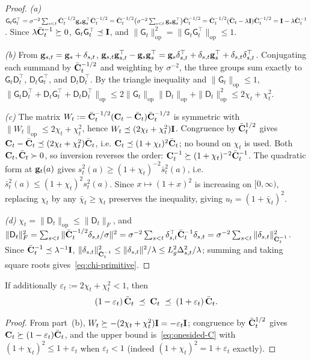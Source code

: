 \documentclass[twoside]{article}
\newcommand{\Gmat}{\mathsf{G}}                  %
\newcommand{\Dmat}{\mathsf{D}}                  %
\begin{document}
\begin{proof}
\emph{(a)}
$\Gmat_t\Gmat_t^\top
=\sigma^{-2}\sum_{s<t}\bCbar_t^{-1/2}\bg_s\bg_s^\top\bCbar_t^{-1/2}
=\bCbar_t^{-1/2}\bigl(\sigma^{-2}\sum_{s<t}\bg_s\bg_s^\top\bigr)\bCbar_t^{-1/2}
=\bCbar_t^{-1/2}(\bCbar_t-\lambda\bI)\bCbar_t^{-1/2}
=\bI-\lambda\bCbar_t^{-1}$.
Since $\lambda\bar{\mathbf{C}}_t^{-1}\succeq0$, $\Gmat_t\Gmat_t^\top\preceq\bI$, and
$\|\Gmat_t\|_{\mathrm{op}}^2=\|\Gmat_t\Gmat_t^\top\|_{\mathrm{op}}\le1$.

\emph{(b)}
From $\mathbf{g}_{s,t}=\mathbf{g}_s+\delta_{s,t}$,
$\mathbf{g}_{s,t}\mathbf{g}_{s,t}^\top-\mathbf{g}_s\mathbf{g}_s^\top
=\mathbf{g}_s\delta_{s,t}^\top+\delta_{s,t}\mathbf{g}_s^\top+\delta_{s,t}\delta_{s,t}^\top$.
Conjugating each summand by $\bar{\mathbf{C}}_t^{-1/2}$ and weighting by
$\sigma^{-2}$, the three groups sum exactly to
$\Gmat_t\Dmat_t^\top$, $\Dmat_t\Gmat_t^\top$, and $\Dmat_t\Dmat_t^\top$.
By the triangle inequality and $\|\Gmat_t\|_{\mathrm{op}}\le1$,
$\|\Gmat_t\Dmat_t^\top+\Dmat_t\Gmat_t^\top+\Dmat_t\Dmat_t^\top\|_{\mathrm{op}}
\le 2\|\Gmat_t\|_{\mathrm{op}}\|\Dmat_t\|_{\mathrm{op}}+\|\Dmat_t\|_{\mathrm{op}}^2
\le 2\chi_t+\chi_t^2$.

\emph{(c)}
The matrix $W_t:=\bar{\mathbf{C}}_t^{-1/2}(\mathbf{C}_t-\bar{\mathbf{C}}_t)\bar{\mathbf{C}}_t^{-1/2}$ is
symmetric with $\|W_t\|_{\mathrm{op}}\le2\chi_t+\chi_t^2$, hence
$W_t\preceq(2\chi_t+\chi_t^2)\mathbf{I}$.  Congruence by $\bar{\mathbf{C}}_t^{1/2}$ gives
$\mathbf{C}_t-\bar{\mathbf{C}}_t\preceq(2\chi_t+\chi_t^2)\bar{\mathbf{C}}_t$, i.e.
$\mathbf{C}_t\preceq(1+\chi_t)^2\bar{\mathbf{C}}_t$; no bound on $\chi_t$ is used.
Both $\mathbf{C}_t,\bar{\mathbf{C}}_t\succ0$, so inversion reverses the order:
$\mathbf{C}_t^{-1}\succeq(1+\chi_t)^{-2}\bar{\mathbf{C}}_t^{-1}$.  The quadratic form at
$\mathbf{g}_t(a)$ gives $s_t^2(a)\ge(1+\chi_t)^{-2}\bar s_t^2(a)$, i.e.
$\bar s_t^2(a)\le(1+\chi_t)^2 s_t^2(a)$.  Since $x\mapsto(1+x)^2$ is
increasing on $[0,\infty)$, replacing $\chi_t$ by any $\bar\chi_t\ge\chi_t$
preserves the inequality, giving $u_t=(1+\bar\chi_t)^2$.

\emph{(d)}
$\chi_t=\|\Dmat_t\|_{\mathrm{op}}\le\|\Dmat_t\|_F$, and
$\|\Dmat_t\|_F^2=\sum_{s<t}\|\bCbar_t^{-1/2}\delta_{s,t}/\sigma\|^2
=\sigma^{-2}\sum_{s<t}\delta_{s,t}^\top\bCbar_t^{-1}\delta_{s,t}
=\sigma^{-2}\sum_{s<t}\|\delta_{s,t}\|_{\bCbar_t^{-1}}^2$.
Since $\bar{\mathbf{C}}_t^{-1}\preceq\lambda^{-1}\mathbf{I}$,
$\|\delta_{s,t}\|_{\bar{\mathbf{C}}_t^{-1}}^2\le\|\delta_{s,t}\|^2/\lambda
\le L_g^2\Delta_{s,t}^2/\lambda$; summing and taking square roots
gives~\eqref{eq:chi-primitive}.
\end{proof}

\begin{corollary}\label{cor:drift-sandwich}
If additionally $\varepsilon_t:=2\chi_t+\chi_t^2<1$, then
\begin{equation}\label{eq:drift-sandwich}
  (1-\varepsilon_t)\,\bar{\mathbf{C}}_t
  \;\preceq\;
  \mathbf{C}_t
  \;\preceq\;
  (1+\varepsilon_t)\,\bar{\mathbf{C}}_t .
\end{equation}
\end{corollary}
\begin{proof}
From part~(b), $W_t\succeq-(2\chi_t+\chi_t^2)\mathbf{I}=-\varepsilon_t\mathbf{I}$;
congruence by $\bar{\mathbf{C}}_t^{1/2}$ gives $\mathbf{C}_t\succeq(1-\varepsilon_t)\bar{\mathbf{C}}_t$,
and the upper bound is~\eqref{eq:onesided-C} with
$(1+\chi_t)^2\le1+\varepsilon_t$ when $\varepsilon_t<1$
(indeed $(1+\chi_t)^2=1+\varepsilon_t$ exactly).
\end{proof}
\end{document}
